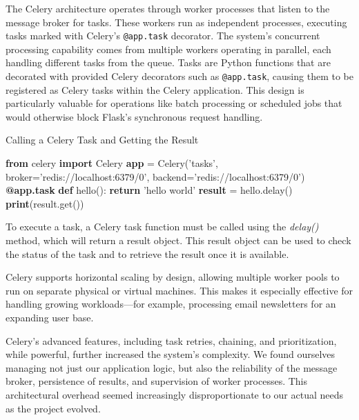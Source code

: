         The Celery architecture operates through worker processes that listen to the message broker for tasks. These workers run as 
        independent processes, executing tasks marked with Celery's \texttt{@app.task} decorator. The system's concurrent processing 
        capability comes from multiple workers operating in parallel, each handling different tasks from the queue. Tasks are Python 
        functions that are decorated with provided Celery decorators such as \texttt{@app.task}, causing them to be registered as 
        Celery tasks within the Celery application. This design is particularly valuable for operations like batch processing or 
        scheduled jobs that would otherwise block Flask's synchronous request handling.

        \begin{algorithm}
            \caption{Calling a Celery Task and Getting the Result}\label{celery-call-result}
            \begin{algorithmic}[1]
            \State \textbf{from} celery \textbf{import} Celery
            \State
            \State \textbf{app} = Celery('tasks', broker='redis://localhost:6379/0', backend='redis://localhost:6379/0')
            \State
            \State \textbf{@app.task}
            \State \textbf{def} hello():
            \State \hspace{1em} \textbf{return} 'hello world'
            \State
            \State \textbf{result} = hello.delay()
            \State \textbf{print}(result.get())
            \end{algorithmic}
        \end{algorithm}

        To execute a task, a Celery task function must be called using the \textit{delay()} method, which will return a result object. 
        This result object can be used to check the status of the task and to retrieve the result once it is available.

        Celery supports horizontal scaling by design, allowing multiple worker pools to run on separate physical or virtual machines. 
        This makes it especially effective for handling growing workloads—for example, processing email newsletters for an expanding 
        user base.

        Celery's advanced features, including task retries, chaining, and prioritization, while powerful, further increased the 
        system's complexity. We found ourselves managing not just our application logic, but also the reliability of the message broker, 
        persistence of results, and supervision of worker processes. This architectural overhead seemed increasingly disproportionate to 
        our actual needs as the project evolved.

